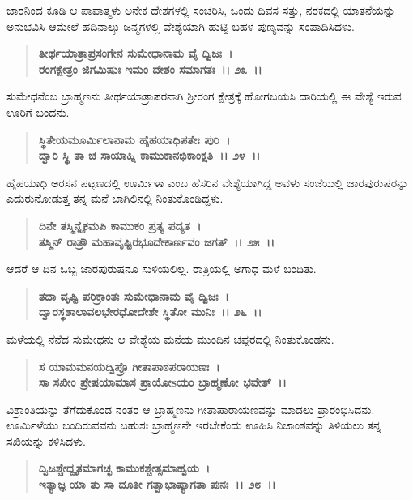 ಜಾರನಿಂದ ಕೂಡಿ ಆ ಪಾಪಾತ್ಮಳು ಅನೇಕ ದೇಶಗಳಲ್ಲಿ ಸಂಚರಿಸಿ, ಒಂದು ದಿವಸ ಸತ್ತು, ನರಕದಲ್ಲಿ ಯಾತನೆಯನ್ನು ಅನುಭವಿಸಿ ಆಮೇಲೆ ಹದಿನಾಲ್ಕು ಜನ್ಮಗಳಲ್ಲಿ ವೇಶ್ಯೆಯಾಗಿ ಹುಟ್ಟಿ ಬಹಳ ಪುಣ್ಯವನ್ನು ಸಂಪಾದಿಸಿದಳು.

\begin{verse}
\textbf{ತೀರ್ಥಯಾತ್ರಾಪ್ರಸಂಗೇನ ಸುಮೇಧಾನಾಮ ವೈ ದ್ವಿಜಃ~।}\\\textbf{ರಂಗಕ್ಷೇತ್ರಂ ಜಿಗಮಿಷುಃ ಇಮಂ ದೇಶಂ ಸಮಾಗತಃ~।। ೨೩~।।}
\end{verse}

ಸುಮೇಧನೆಂಬ ಬ್ರಾಹ್ಮಣನು ತೀರ್ಥಯಾತ್ರಾಪರನಾಗಿ ಶ‍್ರೀರಂಗ ಕ್ಷೇತ್ರಕ್ಕೆ ಹೋಗಬಯಸಿ ದಾರಿಯಲ್ಲಿ ಈ ವೇಶ್ಯೆ ಇರುವ ಊರಿಗೆ ಬಂದನು.

\begin{verse}
\textbf{ಸ್ಥಿತೇಯಮೂರ್ಮಿಲಾನಾಮ ಹೈಹಯಾಧಿಪತೇಃ ಪುರಿ~।}\\\textbf{ದ್ವಾರಿ ಸ್ಥಿ ತಾ ಚ ಸಾಯಾಹ್ನಿ ಕಾಮುಕಾನಭಿಕಾಂಕ್ಷತಿ~।। ೨೪~।।}
\end{verse}

ಹೈಹಯಾಧಿ ಅರಸನ ಪಟ್ಟಣದಲ್ಲಿ ಊರ್ಮಿಳಾ ಎಂಬ ಹೆಸರಿನ ವೇಶ್ಯೆಯಾಗಿದ್ದ ಅವಳು ಸಂಜೆಯಲ್ಲಿ ಜಾರಪುರುಷರನ್ನು ಎದುರುನೋಡುತ್ತ ತನ್ನ ಮನೆ ಬಾಗಿಲಿನಲ್ಲಿ ನಿಂತುಕೊಂಡಿದ್ದಳು.

\begin{verse}
\textbf{ದಿನೇ ತಸ್ಮಿನ್ನೈಕಮಪಿ ಕಾಮುಕಂ ಪ್ರತ್ಯ ಪದ್ಯತ~।}\\\textbf{ತಸ್ಮಿನ್ ರಾತ್ರೌ ಮಹಾವೃಷ್ಟಿರಭೂದೇಕಾರ್ಣವಂ ಜಗತ್~।। ೨೫~।।}
\end{verse}

ಆದರೆ ಆ ದಿನ ಒಬ್ಬ ಜಾರಪುರುಷನೂ ಸುಳಿಯಲಿಲ್ಲ. ರಾತ್ರಿಯಲ್ಲಿ ಅಗಾಧ ಮಳೆ ಬಂದಿತು.

\begin{verse}
\textbf{ತದಾ ವೃಷ್ಟಿ ಪರಿಕ್ರಾಂತಃ ಸುಮೇಧಾನಾಮ ವೈ ದ್ವಿಜಃ~।}\\\textbf{ದ್ವಾರಸ್ಥಶಾಲಾವಲಭೇರಧೋದೇಶೇ ಸ್ಥಿತೋ ಮುನಿಃ~।। ೨೬~।।}
\end{verse}

ಮಳೆಯಲ್ಲಿ ನೆನೆದ ಸುಮೇಧನು ಆ ವೇಶ್ಯೆಯ ಮನೆಯ ಮುಂದಿನ ಚಪ್ಪರದಲ್ಲಿ ನಿಂತುಕೊಂಡನು.

\begin{verse}
\textbf{ಸ ಯಾಮಮನಯದ್ವಿಪ್ರೊ ಗೀತಾಪಾಠಪರಾಯಣಃ~।}\\\textbf{ಸಾ ಸಖೀಂ ಪ್ರೇಷಯಾಮಾಸ ಪ್ರಾಯೋsಯಂ ಬ್ರಾಹ್ಮಣೋ ಭವೇತ್~।।}
\end{verse}

ವಿಶ್ರಾಂತಿಯನ್ನು ತೆಗೆದುಕೊಂಡ ನಂತರ ಆ ಬ್ರಾಹ್ಮಣನು ಗೀತಾಪಾರಾಯಣವನ್ನು ಮಾಡಲು ಪ್ರಾರಂಭಿಸಿದನು. ಊರ್ಮಿಳೆಯು ಬಂದಿರುವವನು ಬಹುಶಃ ಬ್ರಾಹ್ಮಣನೇ ಇರಬೇಕೆಂದು ಊಹಿಸಿ ನಿಜಾಂಶವನ್ನು ತಿಳಿಯಲು ತನ್ನ ಸಖಿಯನ್ನು ಕಳಿಸಿದಳು.

\begin{verse}
\textbf{ದ್ವಿಜಶ್ಚೇದ್ದೃತಮಾಗಚ್ಛ ಕಾಮುಕಶ್ಚೇತ್ಸಮಾಹ್ವಯ~।}\\\textbf{ಇತ್ಯಾಜ್ಞ ಯಾ ತು ಸಾ ದೂತೀ ಗತ್ವಾಭಾಷ್ಯಾಗತಾ ಪುನಃ~।। ೨೮~।।}
\end{verse}

